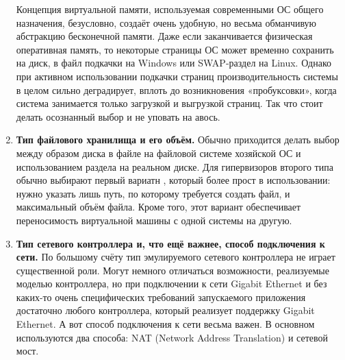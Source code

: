 \documentclass[14pt, a4paper]{article}
\begin{document}
\begin{enumerate}
Концепция виртуальной памяти, используемая современными ОС общего назначения, безусловно,
создаёт очень удобную, но весьма обманчивую абстракцию бесконечной памяти. Даже если
заканчивается физическая оперативная память, то некоторые страницы ОС может временно
сохранить на диск, в файл подкачки на Windows или SWAP-раздел на Linux. Однако при активном
использовании подкачки страниц производительность системы в целом сильно деградирует, вплоть до
возникновения «пробуксовки», когда система занимается только загрузкой и выгрузкой страниц. Так
что стоит делать осознанный выбор и не уповать на авось.

\item \textbf{Тип файлового хранилища и его объём.} Обычно приходится делать выбор между образом
диска в файле на файловой системе хозяйской ОС и использованием раздела на реальном
диске. Для гипервизоров второго типа обычно выбирают первый вариатн , который более прост
в использовании: нужно указать лишь путь, по которому требуется создать файл, и
максимальный объём файла. Кроме того, этот вариант обеспечивает переносимость
виртуальной машины с одной системы на другую.

\item \textbf{Тип сетевого контроллера и, что ещё важнее, способ подключения к сети.} По большому
счёту тип эмулируемого сетевого контроллера не играет существенной роли. Могут немного
отличаться возможности, реализуемые моделью контроллера, но при подключении к сети
Gigabit Ethernet и без каких-то очень специфических требований запускаемого приложения
достаточно любого контроллера, который реализует поддержку Gigabit Ethernet. А вот способ
подключения к сети весьма важен. В основном используются два способа: NAT (Network
Address Translation) и сетевой мост.


\end{enumerate}
\end{document}
